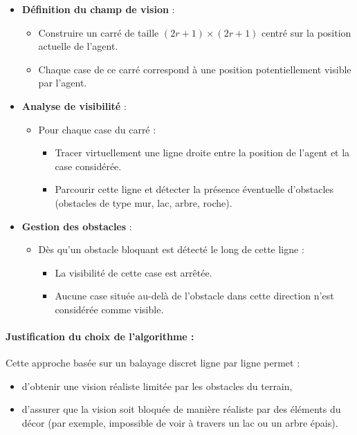 \begin{itemize}
    \item \textbf{Définition du champ de vision} : 
    \begin{itemize}
        \item Construire un carré de taille $(2r+1) \times (2r+1)$ centré sur la position actuelle de l'agent.
        \item Chaque case de ce carré correspond à une position potentiellement visible par l'agent.
    \end{itemize}
    \item \textbf{Analyse de visibilité} : 
    \begin{itemize}
        \item Pour chaque case du carré :
        \begin{itemize}
            \item Tracer virtuellement une ligne droite entre la position de l'agent et la case considérée.
            \item Parcourir cette ligne et détecter la présence éventuelle d'obstacles (obstacles de type mur, lac, arbre, roche).
        \end{itemize}
    \end{itemize}
    \item \textbf{Gestion des obstacles} :
    \begin{itemize}
        \item Dès qu'un obstacle bloquant est détecté le long de cette ligne :
        \begin{itemize}
            \item La visibilité de cette case est arrêtée.
            \item Aucune case située au-delà de l'obstacle dans cette direction n'est considérée comme visible.
        \end{itemize}
    \end{itemize}
\end{itemize}



\paragraph{Justification du choix de l'algorithme :}

Cette approche basée sur un balayage discret ligne par ligne permet :
\begin{itemize}
    \item d'obtenir une vision réaliste limitée par les obstacles du terrain,
    
    \item d'assurer que la vision soit bloquée de manière réaliste par des éléments du décor (par exemple, impossible de voir à travers un lac ou un arbre épais).
\end{itemize}

